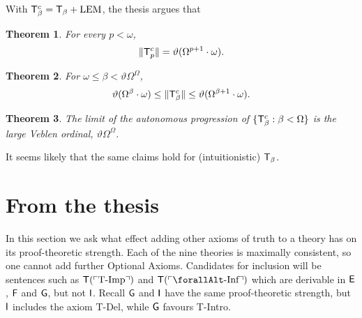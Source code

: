 \documentclass[UKenglish,cleveref,DIV=12]{scrartcl}
\let\forall\forallAlt
\newtheorem{theorem}{Theorem}
\theoremstyle{definition}
\theoremstyle{definition}
\begin{document}
With \( \mathsf{T}^c_\beta = \mathsf{T}_\beta + \textrm{LEM} \), the thesis argues that
%
\begin{theorem}
	For every \( p < \omega \),
\[
  \lVert{\mathsf{T}^c_p}\rVert = \vartheta ( \Omega ^{p+1} \cdot \omega ).
\]
\end{theorem}

\begin{theorem}
	For \( \omega \le \beta < \vartheta \Omega^\Omega \),
\[
	\vartheta(\Omega^\beta \cdot \omega) \le \lVert{\mathsf{T}^c_\beta}\rVert \le \vartheta ( \Omega ^{\beta+1} \cdot \omega ).
\]
\end{theorem}

\begin{theorem}
	The limit of the autonomous progression of \( \{ \mathsf{T}^c_\beta : \beta < \Omega \} \) is the large Veblen ordinal, \( \vartheta \Omega^\Omega \).
\end{theorem}

It seems likely that the same claims hold for (intuitionistic) \( \mathsf{T}_\beta \).


\section{From the thesis}\label{chap:ext}

%
%
In this section we ask what effect adding other axioms of truth to a theory has
on its proof-theoretic strength. Each of the nine theories is maximally
consistent, so one cannot add further Optional Axioms. Candidates for inclusion
will be sentences such as $\mathsf{T}(\ulcorner{\text{T-Imp}}\urcorner)$ and
$\T(\gn{\text{$\forall$-Inf}})$ which are derivable in $\mathsf{E}$, $\mathsf{F}$ and $\mathsf{G}$, but
not $\mathsf{I}$. Recall $\mathsf{G}$ and $\mathsf{I}$ have the same proof-theoretic
strength, but $\mathsf{I}$
includes the axiom T-Del, while $\mathsf{G}$ favours T-Intro.
\end{document}
